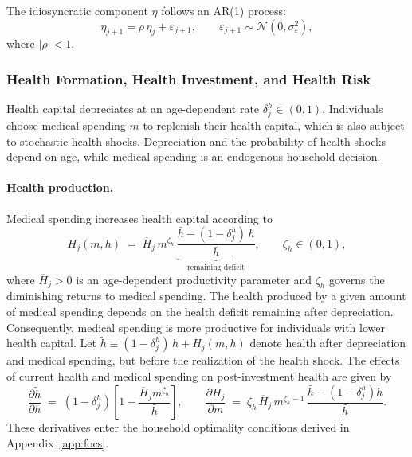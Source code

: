 \documentclass[12pt,a4paper]{article}
\begin{document}
The idiosyncratic component $\eta$ follows an AR(1) process:
\begin{equation}
\label{eq:ar1}
\eta_{j+1} = \rho\, \eta_j + \varepsilon_{j+1}, \qquad \varepsilon_{j+1} \sim \mathcal{N}(0, \sigma_\varepsilon^2),
\end{equation}
where $|\rho| < 1$.


\subsubsection{Health Formation, Health Investment, and Health Risk}
\label{subsubsec:health}

Health capital depreciates at an age-dependent rate $\delta^h_j \in (0,1)$. Individuals choose medical spending $m$ to replenish their health capital, which is also subject to stochastic health shocks. Depreciation and the probability of health shocks depend on age, while medical spending is an endogenous household decision.


\paragraph{Health production.}
Medical spending increases health capital according to
\begin{equation}
\label{eq:health_production_deficit}
H_j(m, h) \;=\; \overline{H}_j\, m^{\zeta_h}\,
   \underbrace{\frac{\bar h - (1-\delta^h_j)\, h}{\bar h}}_{\text{remaining deficit}},
\qquad \zeta_h \in (0,1),
\end{equation}
where $\overline{H}_j > 0$ is an age-dependent productivity parameter and $\zeta_h$ governs the diminishing returns to medical spending. The health produced by a given amount of medical spending depends on the health deficit remaining after depreciation. Consequently, medical spending is more productive for individuals with lower health capital. Let $\tilde h \equiv (1-\delta^h_j)\,h + H_j(m,h)$ denote health after depreciation and medical spending, but before the realization of the health shock. The effects of current health and medical spending on post-investment health are given by
\begin{equation}
\label{eq:dh_dh}
\frac{\partial \tilde h}{\partial h} \;=\; (1-\delta^h_j)\left[1 - \frac{\overline{H}_j m^{\zeta_h}}{\bar h}\right],
\qquad
\frac{\partial H_j}{\partial m} \;=\; \zeta_h\, \overline{H}_j\, m^{\zeta_h - 1}\,\frac{\bar h - (1-\delta^h_j)h}{\bar h}.
\end{equation}
These derivatives enter the household optimality conditions derived in Appendix~\ref{app:focs}.
\end{document}
